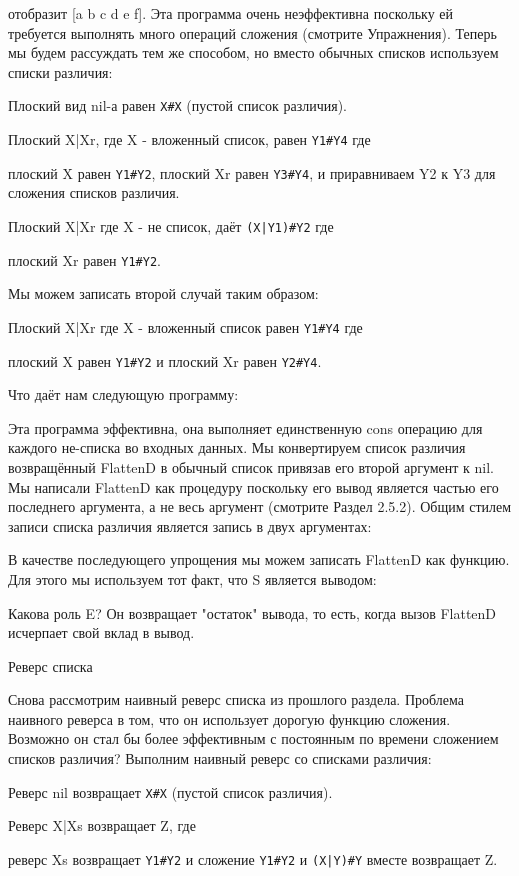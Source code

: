 отобразит [a b c d e f]. Эта программа очень неэффективна поскольку ей требуется выполнять много операций сложения (смотрите Упражнения). Теперь мы будем рассуждать тем же способом, но вместо обычных списков используем списки различия:

Плоский вид nil-а равен \verb|X#X| (пустой список различия).

Плоский X|Xr, где X - вложенный список, равен \verb|Y1#Y4| где

плоский X равен \verb|Y1#Y2|,
плоский Xr равен \verb|Y3#Y4|, и
приравниваем Y2 к Y3 для сложения списков различия.

Плоский X|Xr где X - не список, даёт \verb!(X|Y1)#Y2! где

плоский Xr равен \verb|Y1#Y2|.

Мы можем записать второй случай таким образом:

Плоский X|Xr где X - вложенный список равен \verb|Y1#Y4| где

плоский X равен \verb|Y1#Y2| и
плоский Xr равен \verb|Y2#Y4|.

Что даёт нам следующую программу:

Эта программа эффективна, она выполняет единственную cons операцию для каждого не-списка во входных данных. Мы конвертируем список различия возвращённый FlattenD в обычный список привязав его второй аргумент к nil. Мы написали FlattenD как процедуру поскольку его вывод является частью его последнего аргумента, а не весь аргумент (смотрите Раздел 2.5.2). Общим стилем записи списка различия является запись в двух аргументах:

В качестве последующего упрощения мы можем записать FlattenD как функцию. Для этого мы используем тот факт, что S является выводом:

Какова роль E? Он возвращает "остаток" вывода, то есть, когда вызов FlattenD исчерпает свой вклад в вывод.

Реверс списка

Снова рассмотрим наивный реверс списка из прошлого раздела. Проблема наивного реверса в том, что он использует дорогую функцию сложения. Возможно он стал бы более эффективным с постоянным по времени сложением списков различия? Выполним наивный реверс со списками различия:

Реверс nil возвращает \verb|X#X| (пустой список различия).

Реверс X|Xs возвращает Z, где

реверс Xs возвращает \verb|Y1#Y2| и
сложение \verb|Y1#Y2| и \verb!(X|Y)#Y! вместе возвращает Z.

